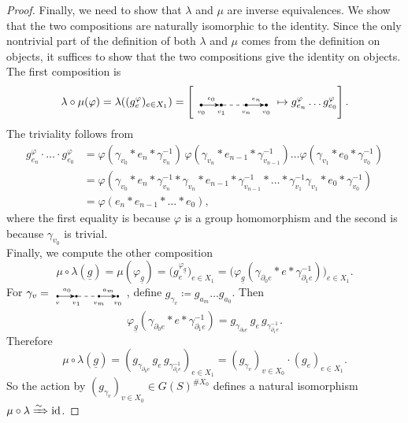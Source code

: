 \begin{proof}
Finally, we need to show that $\lambda$ and $\mu$ are inverse equivalences. We show that the two compositions are naturally isomorphic to the identity. Since the only nontrivial part of the definition of both $\lambda$ and $\mu$ comes from the definition on objects, it suffices to show that the two compositions give the identity on objects. The first composition is
\begin{equation}
\lambda \circ \mu (\varphi)
= \lambda((g_e^{\varphi})_{e \in X_1})
= \left[
\graphfragment{}
\mapsto g_{e_n}^{\varphi} \dots g_{e_0}^{\varphi}\right].
\end{equation}
The triviality follows from
\begin{align}
g_{e_n}^{\varphi} \cdot \dots \cdot g_{e_0}^{\varphi} &= \varphi(\gamma_{v_0}*e_n*\gamma_{v_n}^{-1}) \, \varphi(\gamma_{v_n}*e_{n-1}*\gamma_{v_{n-1}}^{-1}) \dots \varphi(\gamma_{v_1}*e_0*\gamma_{v_0}^{-1}) \\
& = \varphi(\gamma_{v_0}*e_n*\gamma_{v_n}^{-1} * \gamma_{v_n}*e_{n-1}*\gamma_{v_{n-1}}^{-1} * \dots * \gamma_{v_1}^{-1} \gamma_{v_1}*e_0*\gamma_{v_0}^{-1}) \label{trivial comp step 1}\\
& = \varphi ( e_n * e_{n-1} * \dots * e_0 ), \label{trivial comp step 2}
\end{align}
where the first equality is because $\varphi$ is a group homomorphism and the second is because $\gamma_{v_0}$ is trivial.\\
Finally, we compute the other composition
\begin{equation}
\mu \circ \lambda (\underline{g}) = \mu(\varphi_{\underline{g}}) = \big(g_e^{\varphi_{\underline{g}}}\big)_{e \in X_1} = \big(\varphi_{\underline{g}}(\gamma_{\partial_0 e} * e * \gamma_{\partial_1 e}^{-1})\big)_{e \in X_1}.
\end{equation}
For $\gamma_v =
\begin{tikzpicture}[baseline={(v.center)}, xscale=0.6, yscale=1]
    \tikzset{dot/.style={circle, fill, inner sep=0.8pt}}
    \node[dot, label=below:{\tiny $v$}] (v) at (0,0) {};
    \node[dot, label=below:{\tiny $v_1$}] (v1) at (1,0) {};
    \node[dot, label=below:{\tiny $v_m$}] (vn) at (2.2,0) {};
    \node[dot, label=below:{\tiny $v_0$}] (v0) at (3.2,0) {};
    \draw[-{Stealth}] (v) -- node[above] {\tiny $a_0$} (v1);
    \draw[dashed] (v1) -- (vn);
    \draw[-{Stealth}] (vn) -- node[above] {\tiny $a_m$} (v0);
\end{tikzpicture}$, define $g_{\gamma_v} \coloneqq g_{a_m}\dots g_{a_0}$. Then
\begin{equation}
\varphi_{\underline{g}}(\gamma_{\partial_0 e} * e * \gamma_{\partial_1 e}^{-1}) = g_{\gamma_{\partial_0 e}} \, g_e \, g_{\gamma_{\partial_1 e}^{-1}}.
\end{equation}
Therefore
\begin{equation}
\mu \circ \lambda (\underline{g}) = \left(g_{\gamma_{\partial_0 e}} \, g_e \, g_{\gamma_{\partial_1 e}^{-1}}\right)_{e \in X_1} = (g_{\gamma_v})_{v \in X_0} \cdot (g_e)_{e \in X_1}.
\end{equation}
So the action by $ (g_{\gamma_v})_{v \in X_0} \in G(S)^{\# X_0} $ defines a natural isomorphism $\mu \circ \lambda \xRightarrow{\sim} \text{id}$.


\end{proof}
